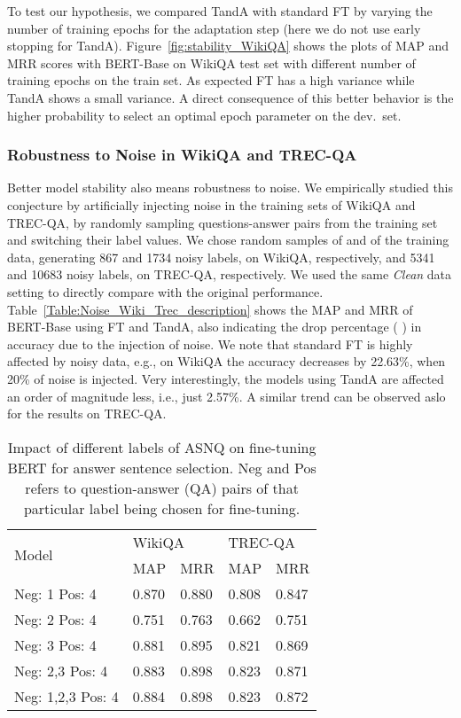 \documentclass[letterpaper]{article} \usepackage{aaai20}  \usepackage{times}  \usepackage{helvet} \usepackage{courier}  \usepackage[hyphens]{url}  \usepackage{graphicx} \urlstyle{rm} \def\UrlFont{\rm}  \usepackage{graphicx}  \usepackage{todonotes}
\newcommand{\TANDA}{T{\sc and}A}
\begin{document}
To test our hypothesis, we compared {\TANDA} with standard FT by varying the number of training epochs for the adaptation step (here we do not use early stopping for {\TANDA}).  Figure~\ref{fig:stability_WikiQA} shows the plots of MAP and MRR scores with BERT-Base on WikiQA test set with different number of training epochs on the train set. As expected FT has a high variance while {\TANDA} shows a small variance. A direct consequence of this better behavior is the higher probability to select an optimal epoch parameter on the dev.~set.

\subsubsection{Robustness to Noise in WikiQA and TREC-QA}
Better model stability also means robustness to noise. We empirically studied this conjecture by artificially injecting noise in the training sets of WikiQA and TREC-QA, by randomly sampling questions-answer pairs from the training set and switching their label values. We chose random samples of  and  of the training data, generating 867 and 1734 noisy labels, on WikiQA, respectively, and 5341 and 10683 noisy labels, on TREC-QA, respectively. We used the same \emph{Clean} data setting to directly compare with the original performance.  Table~\ref{Table:Noise_Wiki_Trec_description} shows the MAP and MRR of BERT-Base using FT and {\TANDA}, also indicating the drop percentage ( ) in accuracy due to the injection of noise. We note that standard FT is highly affected by noisy data, e.g., on \mbox{WikiQA} the accuracy decreases by 22.63\%, when 20\% of noise is injected. Very interestingly, the models using {\TANDA} are affected an order of magnitude less, i.e., just 2.57\%. A similar trend can be observed aslo for the results on TREC-QA.



\begin{table}[h]
\small
\center
\begin{tabular}{|l|l|l|l|l|}
\hline
\multirow{2}{*}{Model}    & \multicolumn{2}{l|}{WikiQA} & \multicolumn{2}{l|}{TREC-QA} \\ \cline{2-5} 
                         & MAP          & MRR          & MAP          & MRR          \\ \hline
Neg: 1 Pos: 4   					& 0.870 & 0.880 & 0.808 & 0.847         \\ \hline
Neg: 2 Pos: 4         				& 0.751 & 0.763 & 0.662 & 0.751  \\ \hline
Neg: 3 Pos: 4 						& 0.881 & 0.895 & 0.821 & 0.869  \\ \hline
Neg: 2,3 Pos: 4 					& 0.883 & 0.898 & 0.823 & 0.871  \\ \hline
Neg: 1,2,3 Pos: 4 					& 0.884 & 0.898 & 0.823  & 0.872 \\ \hline
\end{tabular}\caption{Impact of different labels of ASNQ on fine-tuning BERT for answer sentence selection. Neg and Pos refers to question-answer (QA) pairs of that particular label being chosen for fine-tuning.}
\label{Table:ASNQ_expts}
\vspace{-.5em}
\end{table}
\end{document}
